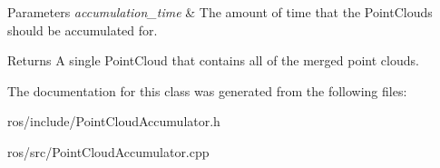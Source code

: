 \begin{DoxyParams}{\-Parameters}
{\em accumulation\-\_\-time} & \-The amount of time that the \-Point\-Clouds should be accumulated for.\\
\hline
\end{DoxyParams}
\begin{DoxyReturn}{\-Returns}
\-A single \-Point\-Cloud that contains all of the merged point clouds. 
\end{DoxyReturn}


\-The documentation for this class was generated from the following files\-:\begin{DoxyCompactItemize}
\item 
ros/include/\-Point\-Cloud\-Accumulator.\-h\item 
ros/src/\-Point\-Cloud\-Accumulator.\-cpp\end{DoxyCompactItemize}
